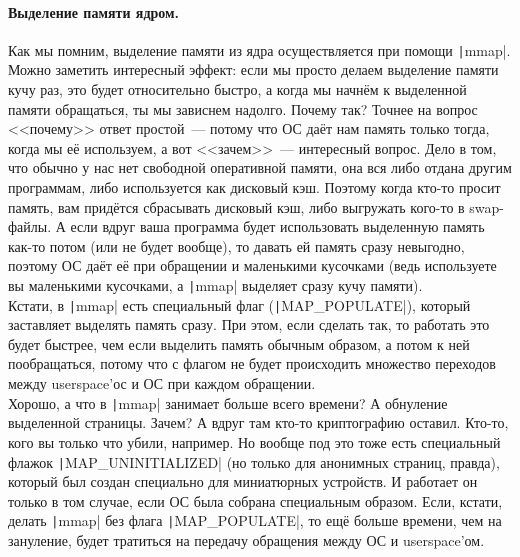 \documentclass{article}
\begin{document}
    \paragraph{Выделение памяти ядром.}
    Как мы помним, выделение памяти из ядра осуществляется при помощи \texttt|mmap|. Можно заметить интересный эффект: если мы просто делаем выделение памяти кучу раз, это будет относительно быстро, а когда мы начнём к выделенной памяти обращаться, ты мы зависнем надолго. Почему так? Точнее на вопрос <<почему>> ответ простой~--- потому что ОС даёт нам память только тогда, когда мы её используем, а вот <<зачем>>~--- интересный вопрос. Дело в том, что обычно у нас нет свободной оперативной памяти, она вся либо отдана другим программам, либо используется как дисковый кэш. Поэтому когда кто-то просит память, вам придётся сбрасывать дисковый кэш, либо выгружать кого-то в swap-файлы. А если вдруг ваша программа будет использовать выделенную память как-то потом (или не будет вообще), то давать ей память сразу невыгодно, поэтому ОС даёт её при обращении и маленькими кусочками (ведь используете вы маленькими кусочками, а \texttt|mmap| выделяет сразу кучу памяти).\\
    Кстати, в \texttt|mmap| есть специальный флаг (\texttt|MAP_POPULATE|), который заставляет выделять память сразу. При этом, если сделать так, то работать это будет быстрее, чем если выделить память обычным образом, а потом к ней пообращаться, потому что с флагом не будет происходить множество переходов между userspace'ос и ОС при каждом обращении.\\
    Хорошо, а что в \texttt|mmap| занимает больше всего времени? А обнуление выделенной страницы. Зачем? А вдруг там кто-то криптографию оставил. Кто-то, кого вы только что убили, например. Но вообще под это тоже есть специальный флажок \texttt|MAP_UNINITIALIZED| (но только для анонимных страниц, правда), который был создан специально для миниатюрных устройств. И работает он только в том случае, если ОС была собрана специальным образом. Если, кстати, делать \texttt|mmap| без флага \texttt|MAP_POPULATE|, то ещё больше времени, чем на зануление, будет тратиться на передачу обращения между ОС и userspace'ом.
\end{document}
